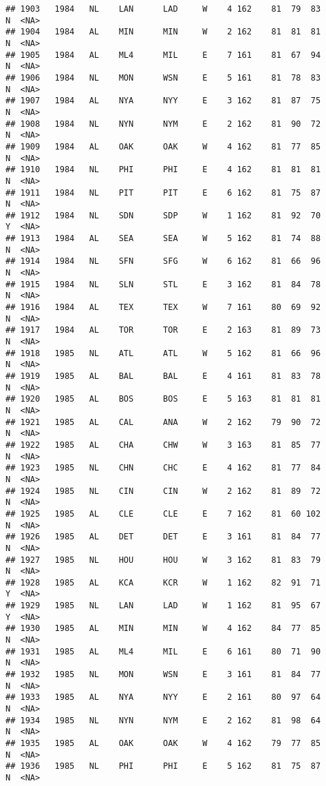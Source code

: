 \documentclass[]{article}
\begin{document}
\begin{verbatim}
## 1903   1984   NL    LAN      LAD     W    4 162    81  79  83      N  <NA>
## 1904   1984   AL    MIN      MIN     W    2 162    81  81  81      N  <NA>
## 1905   1984   AL    ML4      MIL     E    7 161    81  67  94      N  <NA>
## 1906   1984   NL    MON      WSN     E    5 161    81  78  83      N  <NA>
## 1907   1984   AL    NYA      NYY     E    3 162    81  87  75      N  <NA>
## 1908   1984   NL    NYN      NYM     E    2 162    81  90  72      N  <NA>
## 1909   1984   AL    OAK      OAK     W    4 162    81  77  85      N  <NA>
## 1910   1984   NL    PHI      PHI     E    4 162    81  81  81      N  <NA>
## 1911   1984   NL    PIT      PIT     E    6 162    81  75  87      N  <NA>
## 1912   1984   NL    SDN      SDP     W    1 162    81  92  70      Y  <NA>
## 1913   1984   AL    SEA      SEA     W    5 162    81  74  88      N  <NA>
## 1914   1984   NL    SFN      SFG     W    6 162    81  66  96      N  <NA>
## 1915   1984   NL    SLN      STL     E    3 162    81  84  78      N  <NA>
## 1916   1984   AL    TEX      TEX     W    7 161    80  69  92      N  <NA>
## 1917   1984   AL    TOR      TOR     E    2 163    81  89  73      N  <NA>
## 1918   1985   NL    ATL      ATL     W    5 162    81  66  96      N  <NA>
## 1919   1985   AL    BAL      BAL     E    4 161    81  83  78      N  <NA>
## 1920   1985   AL    BOS      BOS     E    5 163    81  81  81      N  <NA>
## 1921   1985   AL    CAL      ANA     W    2 162    79  90  72      N  <NA>
## 1922   1985   AL    CHA      CHW     W    3 163    81  85  77      N  <NA>
## 1923   1985   NL    CHN      CHC     E    4 162    81  77  84      N  <NA>
## 1924   1985   NL    CIN      CIN     W    2 162    81  89  72      N  <NA>
## 1925   1985   AL    CLE      CLE     E    7 162    81  60 102      N  <NA>
## 1926   1985   AL    DET      DET     E    3 161    81  84  77      N  <NA>
## 1927   1985   NL    HOU      HOU     W    3 162    81  83  79      N  <NA>
## 1928   1985   AL    KCA      KCR     W    1 162    82  91  71      Y  <NA>
## 1929   1985   NL    LAN      LAD     W    1 162    81  95  67      Y  <NA>
## 1930   1985   AL    MIN      MIN     W    4 162    84  77  85      N  <NA>
## 1931   1985   AL    ML4      MIL     E    6 161    80  71  90      N  <NA>
## 1932   1985   NL    MON      WSN     E    3 161    81  84  77      N  <NA>
## 1933   1985   AL    NYA      NYY     E    2 161    80  97  64      N  <NA>
## 1934   1985   NL    NYN      NYM     E    2 162    81  98  64      N  <NA>
## 1935   1985   AL    OAK      OAK     W    4 162    79  77  85      N  <NA>
## 1936   1985   NL    PHI      PHI     E    5 162    81  75  87      N  <NA>

\end{verbatim}
\end{document}
